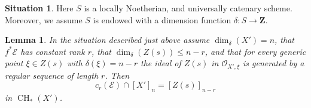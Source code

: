 \documentclass{amsart}
\theoremstyle{plain}
\newtheorem{lemma}[subsection]{Lemma}
\theoremstyle{definition}
\newtheorem{situation}[subsection]{Situation}
\theoremstyle{remark}
\numberwithin{equation}{subsection}
\def\CH{\mathop{\mathrm{CH}}\nolimits}
\begin{document}
\begin{situation}
\label{situation-setup}
Here $S$ is a locally Noetherian, and universally catenary scheme.
Moreover, we assume $S$ is endowed with a dimension function
$\delta : S \longrightarrow \mathbf{Z}$.
\end{situation}

\begin{lemma}
\label{lemma-top-chern-class}
In the situation described just above assume $\dim_\delta(X') = n$,
that $f^*\mathcal{E}$ has constant rank $r$, that
$\dim_\delta(Z(s)) \leq n - r$, and that for every generic point
$\xi \in Z(s)$ with $\delta(\xi) = n - r$ the ideal of $Z(s)$
in $\mathcal{O}_{X', \xi}$ is generated by a regular sequence
of length $r$. Then
$$
c_r(\mathcal{E}) \cap [X']_n = [Z(s)]_{n - r}
$$
in $\CH_*(X')$.
\end{lemma}
\end{document}
